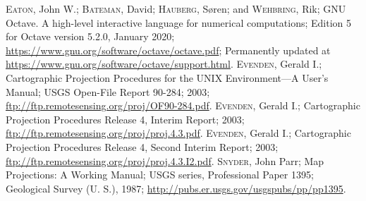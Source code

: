 \documentclass[10pt,a4paper]{article}
\begin{document}
\begin{thebibliography}{99}
 \textsc{Eaton}, John W.; \textsc{Bateman}, David;
                 \textsc{Hauberg}, S\o{}ren; and \textsc{Wehbring}, Rik;
                 GNU Octave. A high-level interactive language for numerical
                 computations; Edition 5 for Octave version 5.2.0, January 2020;
                 \url{https://www.gnu.org/software/octave/octave.pdf};
                 Permanently updated at
                 \url{https://www.gnu.org/software/octave/support.html}.
 \textsc{Evenden}, Gerald I.; Cartographic Projection
                  Procedures for the UNIX Environment---A User's Manual; USGS
                  Open-File Report 90-284; 2003;
                  \url{ftp://ftp.remotesensing.org/proj/OF90-284.pdf}.
 \textsc{Evenden}, Gerald I.; Cartographic Projection
                  Procedures Release 4, Interim Report; 2003;
                  \url{ftp://ftp.remotesensing.org/proj/proj.4.3.pdf}.
 \textsc{Evenden}, Gerald I.; Cartographic Projection
                  Procedures Release 4, Second Interim Report; 2003;
                  \url{ftp://ftp.remotesensing.org/proj/proj.4.3.I2.pdf}.
 \textsc{Snyder}, John Parr; Map Projections: A Working Manual;
                 USGS series, Professional Paper 1395; Geological Survey
                 (U. S.), 1987;
                 \url{http://pubs.er.usgs.gov/usgspubs/pp/pp1395}.
\end{thebibliography}
\end{document}
